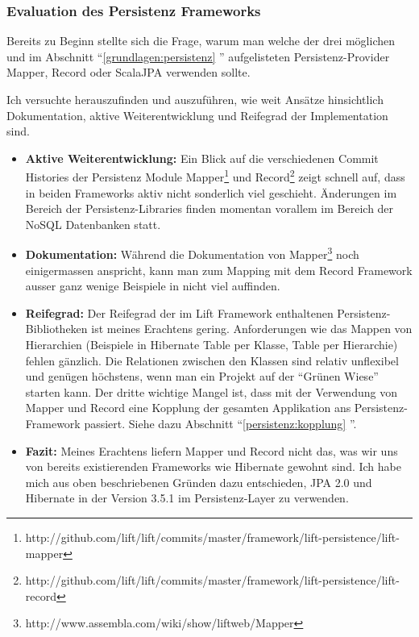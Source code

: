 \subsubsection{Evaluation des Persistenz Frameworks}
Bereits zu Beginn stellte sich die Frage, warum man welche der drei m\"oglichen und im Abschnitt ``\ref{grundlagen:persistenz} '' aufgelisteten Persistenz-Provider Mapper, Record oder ScalaJPA  verwenden sollte.

Ich versuchte herauszufinden und auszuf\"uhren, wie weit Ans\"atze hinsichtlich Dokumentation, aktive Weiterentwicklung und Reifegrad der Implementation sind.

\begin{itemize}
\item \textbf{Aktive Weiterentwicklung: }Ein Blick auf die verschiedenen Commit Histories der Persistenz Module Mapper\footnote{http://github.com/lift/lift/commits/master/framework/lift-persistence/lift-mapper} und Record\footnote{http://github.com/lift/lift/commits/master/framework/lift-persistence/lift-record} zeigt schnell auf, dass in beiden Frameworks aktiv nicht sonderlich viel geschieht. \"Anderungen im Bereich der Persistenz-Libraries finden momentan vorallem im Bereich der NoSQL Datenbanken statt. 

\item \textbf{Dokumentation: }W\"ahrend die Dokumentation von Mapper\footnote{http://www.assembla.com/wiki/show/liftweb/Mapper} noch einigermassen anspricht, kann man zum Mapping mit dem Record Framework ausser ganz wenige Beispiele in \cite[p. 79 - 113]{chen2009lift} nicht viel auffinden.

\item \textbf{Reifegrad: }Der Reifegrad der im Lift Framework enthaltenen Persistenz-Bibliotheken ist meines Erachtens gering. Anforderungen wie das Mappen von Hierarchien (Beispiele in Hibernate Table per Klasse, Table per Hierarchie) fehlen g\"anzlich. Die Relationen zwischen den Klassen sind relativ unflexibel und gen\"ugen h\"ochstens, wenn man ein Projekt auf der ``Gr\"unen Wiese'' starten kann. Der dritte wichtige Mangel ist, dass mit der Verwendung von Mapper und Record eine Kopplung der gesamten Applikation ans Persistenz-Framework passiert. Siehe dazu Abschnitt ``\ref{persistenz:kopplung} ''.


\item \textbf{Fazit: }Meines Erachtens liefern Mapper und Record nicht das, was wir uns von bereits existierenden Frameworks wie Hibernate gewohnt sind. Ich habe mich aus oben beschriebenen Gr\"unden dazu entschieden, JPA 2.0 und Hibernate in der Version 3.5.1 im Persistenz-Layer zu verwenden. 

\end{itemize}
